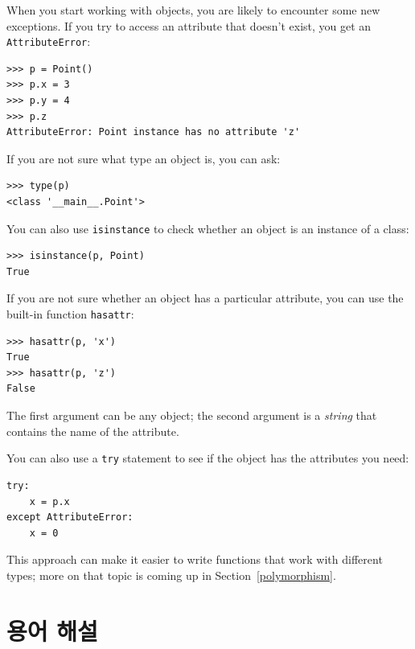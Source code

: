 \documentclass[10pt]{book}
\begin{document}
When you start working with objects, you are likely to encounter
some new exceptions.  If you try to access an attribute
that doesn't exist, you get an {\tt AttributeError}:

\begin{verbatim}
>>> p = Point()
>>> p.x = 3
>>> p.y = 4
>>> p.z
AttributeError: Point instance has no attribute 'z'
\end{verbatim}
%
If you are not sure what type an object is, you can ask:

\begin{verbatim}
>>> type(p)
<class '__main__.Point'>
\end{verbatim}
%
You can also use {\tt isinstance} to check whether an object
is an instance of a class:

\begin{verbatim}
>>> isinstance(p, Point)
True
\end{verbatim}
%
If you are not sure whether an object has a particular attribute,
you can use the built-in function {\tt hasattr}:

\begin{verbatim}
>>> hasattr(p, 'x')
True
>>> hasattr(p, 'z')
False
\end{verbatim}
%
The first argument can be any object; the second argument is a {\em
string} that contains the name of the attribute.

You can also use a {\tt try} statement to see if the object has the
attributes you need:

\begin{verbatim}
try:
    x = p.x
except AttributeError:
    x = 0
\end{verbatim}

This approach can make it easier to write functions that work with
different types; more on that topic is
coming up in Section~\ref{polymorphism}.


\section{용어 해설}
\end{document}
